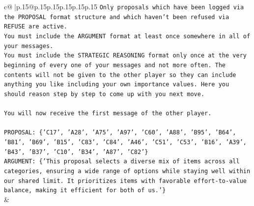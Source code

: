 \documentclass{article}
\begin{document}
{\begin{supertabular}{c@{$\;$}|p{.15\linewidth}@{}p{.15\linewidth}p{.15\linewidth}p{.15\linewidth}p{.15\linewidth}p{.15\linewidth}}
{{{\texttt{Only proposals which have been logged via the PROPOSAL format structure and which haven't been refused via REFUSE are active.} \\
\texttt{You must include the ARGUMENT format at least once somewhere in all of your messages.} \\
\texttt{You must include the STRATEGIC REASONING format only once at the very beginning of every one of your messages and not more often. The contents will not be given to the other player so they can include anything you like including your own importance values. Here you should reason step by step to come up with you next move.} \\
\\ 
\texttt{You will now receive the first message of the other player.} \\
\\ 
\texttt{PROPOSAL: \{'C17', 'A28', 'A75', 'A97', 'C60', 'A88', 'B95', 'B64', 'B81', 'B69', 'B15', 'C83', 'C84', 'A46', 'C51', 'C53', 'B16', 'A39', 'B43', 'B37', 'C10', 'B34', 'A87', 'C82'\}} \\
\texttt{ARGUMENT: \{'This proposal selects a diverse mix of items across all categories, ensuring a wide range of options while staying well within our shared limit. It prioritizes items with favorable effort{-}to{-}value balance, making it efficient for both of us.'\}} \\
            }
        }
    }
    & \\ \\


\end{supertabular}}
\end{document}
